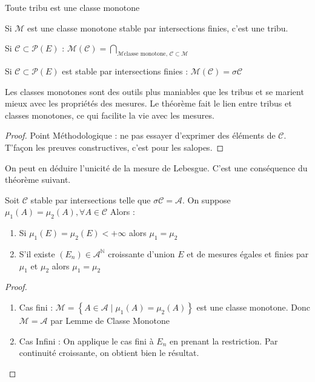 \documentclass{cours}
\begin{document}
    \begin{remark}
        Toute tribu est une classe monotone
    \end{remark}

    \begin{lemma}
        Si $\mathcal{M}$ est une classe monotone stable par intersections finies, c'est une tribu.
    \end{lemma}
    \begin{definition}
        Si $\mathcal{C} \subset \mathcal{P}(E)$ : $\mathcal{M}(\mathcal{C}) = \bigcap\limits_{\mathcal{M} \text{classe monotone, } \mathcal{C}\subset\mathcal{M}}$
    \end{definition}
    \begin{theorem}
        Si $\mathcal{C} \subset \mathcal{P}(E)$ est stable par intersections finies : $\mathcal{M}(\mathcal{C}) = \sigma{\mathcal{C}}$
    \end{theorem}
    \begin{remark}
        Les classes monotones sont des outils plus maniables que les tribus et se marient mieux avec les propriétés des mesures. Le théorème fait le lien entre tribus et classes monotones, ce qui facilite la vie avec les mesures. 
    \end{remark}
    \begin{proof}
        Point Méthodologique : ne pas essayer d'exprimer des éléments de $\mathcal{C}$. T'façon les preuves constructives, c'est pour les salopes. 
    \end{proof}
    \begin{remark}
        On peut en déduire l'unicité de la mesure de Lebesgue. C'est une conséquence du théorème suivant.
    \end{remark} 
    \begin{theorem}
        Soit $\mathcal{C}$ stable par intersections telle que $\sigma{\mathcal{C}} = \mathcal{A}$.
        On suppose $\mu_{1}(A) = \mu_{2}(A), \forall A \in \mathcal{C}$
        Alors : \begin{enumerate}
            \item Si $\mu_{1}(E) = \mu_{2}(E) < +\infty$ alors $\mu_{1} = \mu_{2}$
            \item S'il existe $(E_n) \in \mathcal{A}^{\mathbb{N}}$ croissante d'union $E$ et de mesures égales et finies par $\mu_{1}$ et $\mu_{2}$ alors $\mu_{1} = \mu_{2}$
        \end{enumerate}
    \end{theorem}
    \begin{proof}
        \begin{enumerate}
            \item Cas fini : $\mathcal{M} = \left\{A \in \mathcal{A} \mid \mu_{1}(A) = \mu_{2}(A)\right\}$ est une classe monotone. Donc $\mathcal{M} = \mathcal{A}$ par Lemme de Classe Monotone
            \item Cas Infini : On applique le cas fini à $E_{n}$ en prenant la restriction. Par continuité croissante, on obtient bien le résultat. 
        \end{enumerate}
    \end{proof}
    
\end{document}
